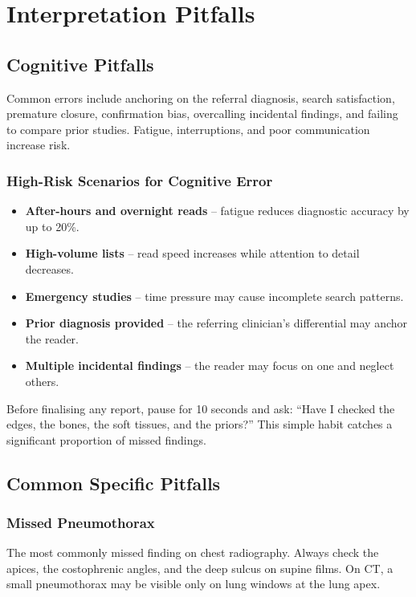\chapter{Interpretation Pitfalls}

\label{ch:ch35_pitfalls}

\section{Cognitive Pitfalls}
Common errors include anchoring on the referral diagnosis, search satisfaction, premature closure, confirmation bias, overcalling incidental findings, and failing to compare prior studies. Fatigue, interruptions, and poor communication increase risk.

\subsection{High-Risk Scenarios for Cognitive Error}
\begin{itemize}
    \item \textbf{After-hours and overnight reads} -- fatigue reduces diagnostic accuracy by up to 20\%.
    \item \textbf{High-volume lists} -- read speed increases while attention to detail decreases.
    \item \textbf{Emergency studies} -- time pressure may cause incomplete search patterns.
    \item \textbf{Prior diagnosis provided} -- the referring clinician's differential may anchor the reader.
    \item \textbf{Multiple incidental findings} -- the reader may focus on one and neglect others.
\end{itemize}

\begin{pearlbox}
Before finalising any report, pause for 10 seconds and ask: ``Have I checked the edges, the bones, the soft tissues, and the priors?'' This simple habit catches a significant proportion of missed findings.
\end{pearlbox}

\section{Common Specific Pitfalls}

\subsection{Missed Pneumothorax}
The most commonly missed finding on chest radiography. Always check the apices, the costophrenic angles, and the deep sulcus on supine films. On CT, a small pneumothorax may be visible only on lung windows at the lung apex.

